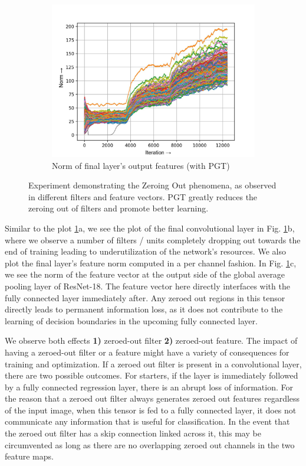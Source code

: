 \documentclass[times,sort&compress]{elsarticle}
\begin{document}
\begin{figure}[t]
\begin{subfigure}[t]{0.32\textwidth}
\includegraphics[width=\linewidth]{pgt-f-layer-22-1}
\caption{Norm of final layer's output features (with PGT)}
\end{subfigure}
\captionsetup{font=normalsize}
\caption{ Experiment demonstrating the Zeroing Out phenomena, as observed in different
filters and feature vectors. PGT greatly reduces the zeroing out of filters and promote
better learning. }
\label{fig:norm_plots}
\end{figure}





Similar to the plot \ref{fig:norm_plots}a, we see the plot of the final convolutional
layer in Fig. \ref{fig:norm_plots}b, where we observe a number of filters / units
completely dropping out towards the end of training leading to underutilization of the
network's resources. We also plot the final layer's feature norm computed in a per
channel fashion. In Fig. \ref{fig:norm_plots}c, we see the norm of the feature vector at
the output side of the global average pooling layer of ResNet-18. The feature vector
here directly interfaces with the fully connected layer immediately after. Any zeroed
out regions in this tensor directly leads to permanent information loss, as it does not
contribute to the learning of decision boundaries in the upcoming fully connected layer.

We observe both effects \textbf{1)} zeroed-out filter \textbf{2)} zeroed-out feature.
The impact of having a zeroed-out filter or a feature might have a variety of
consequences for training and optimization. If a zeroed out filter is present in a
convolutional layer, there are two possible outcomes. For starters, if the layer is
immediately followed by a fully connected regression layer, there is an abrupt loss of
information. For the reason that a zeroed out filter always generates zeroed out
features regardless of the input image, when this tensor is fed to a fully connected
layer, it does not communicate any information that is useful for classification. In the
event that the zeroed out filter has a skip connection linked across it, this may be
circumvented as long as there are no overlapping zeroed out channels in the two feature
maps.
\end{document}
